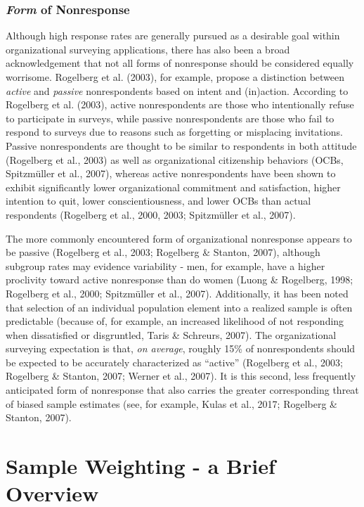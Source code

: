 \documentclass[
  man,mask]{apa7}
\begin{document}
\hypertarget{form-of-nonresponse}{%
\subsubsection{\texorpdfstring{\emph{Form} of Nonresponse}{Form of Nonresponse}}\label{form-of-nonresponse}}

Although high response rates are generally pursued as a desirable goal within organizational surveying applications, there has also been a broad acknowledgement that not all forms of nonresponse should be considered equally worrisome. Rogelberg et al. (2003), for example, propose a distinction between \emph{active} and \emph{passive} nonrespondents based on intent and (in)action. According to Rogelberg et al. (2003), active nonrespondents are those who intentionally refuse to participate in surveys, while passive nonrespondents are those who fail to respond to surveys due to reasons such as forgetting or misplacing invitations. Passive nonrespondents are thought to be similar to respondents in both attitude (Rogelberg et al., 2003) as well as organizational citizenship behaviors (OCBs, Spitzmüller et al., 2007), whereas active nonrespondents have been shown to exhibit significantly lower organizational commitment and satisfaction, higher intention to quit, lower conscientiousness, and lower OCBs than actual respondents (Rogelberg et al., 2000, 2003; Spitzmüller et al., 2007).

The more commonly encountered form of organizational nonresponse appears to be passive (Rogelberg et al., 2003; Rogelberg \& Stanton, 2007), although subgroup rates may evidence variability - men, for example, have a higher proclivity toward active nonresponse than do women (Luong \& Rogelberg, 1998; Rogelberg et al., 2000; Spitzmüller et al., 2007). Additionally, it has been noted that selection of an individual population element into a realized sample is often predictable (because of, for example, an increased likelihood of not responding when dissatisfied or disgruntled, Taris \& Schreurs, 2007). The organizational surveying expectation is that, \emph{on average}, roughly 15\% of nonrespondents should be expected to be accurately characterized as ``active'' (Rogelberg et al., 2003; Rogelberg \& Stanton, 2007; Werner et al., 2007). It is this second, less frequently anticipated form of nonresponse that also carries the greater corresponding threat of biased sample estimates (see, for example, Kulas et al., 2017; Rogelberg \& Stanton, 2007).

\hypertarget{sample-weighting---a-brief-overview}{%
\section{Sample Weighting - a Brief Overview}\label{sample-weighting---a-brief-overview}}
\end{document}
